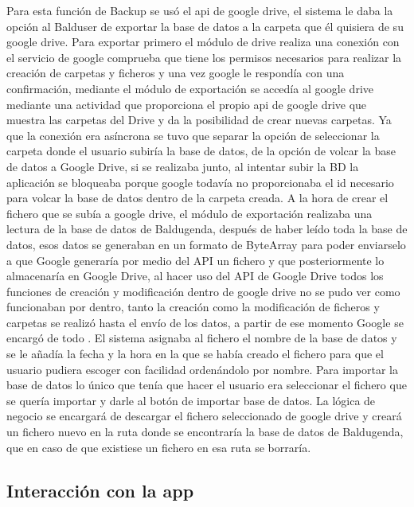 Para esta función de Backup se usó el api de google drive, el sistema le daba la opción al Balduser de exportar la base de datos a la carpeta que él quisiera de su google drive.
Para exportar primero el módulo de drive realiza una conexión con el servicio de google comprueba que tiene los permisos necesarios para realizar la creación de carpetas y ficheros y una vez google le respondía con una confirmación, mediante el módulo de exportación se accedía al google drive mediante una actividad que proporciona el propio api de google drive que muestra las carpetas del Drive y da la posibilidad de crear nuevas carpetas.
Ya que la conexión era asíncrona se tuvo que separar la opción de seleccionar la carpeta donde el usuario subiría la base de datos, de la opción de volcar la base de datos a Google Drive,  si se realizaba junto, al intentar subir la BD la aplicación se bloqueaba porque google todavía no proporcionaba el id necesario para volcar la base de datos dentro de la carpeta creada.
A la hora de crear el fichero que se subía a google drive, el módulo de exportación realizaba una lectura de la base de datos de Baldugenda, después de haber leído toda la base de datos, esos datos se generaban en un formato de ByteArray para poder enviarselo a que Google generaría por medio del API un fichero y que posteriormente lo almacenaría en Google Drive, al hacer uso del API de Google Drive todos los funciones de creación y modificación dentro de google drive no se pudo ver como funcionaban por dentro, tanto la creación como la modificación de ficheros y carpetas se realizó hasta el envío de los datos, a partir de ese momento Google se encargó de todo .
El sistema asignaba al fichero el nombre de la base de datos y se le añadía la fecha y la hora en la que se había creado el fichero para que el usuario pudiera escoger con facilidad ordenándolo por nombre.
Para importar la base de datos lo único que tenía que hacer el usuario era seleccionar el fichero que se quería importar y darle al botón de importar base de datos.
La lógica de negocio se encargará de descargar el fichero seleccionado de google drive y creará un fichero nuevo en la ruta donde se encontraría la base de datos de Baldugenda, que en caso de que existiese un fichero en esa ruta se borraría.

\subsection{Interacción con la app}
\label{subsecc:Interacción con la app}

